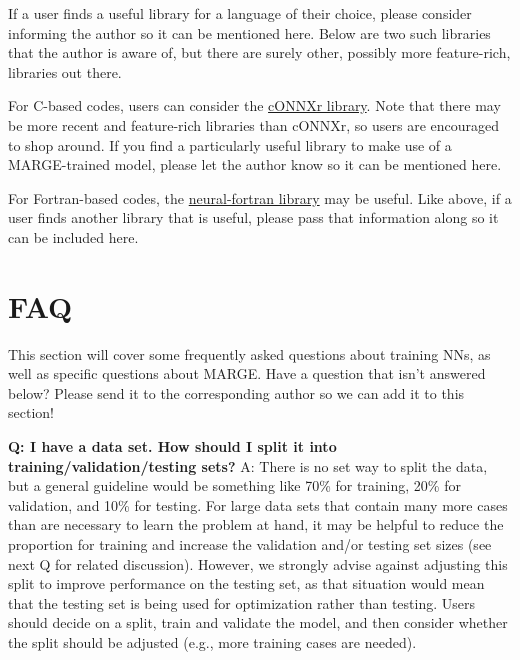 \documentclass[letterpaper, 12pt]{article}
\begin{document}
\noindent If a user finds a useful library for a language of their choice, please 
consider informing the author so it can be mentioned here.  Below are two 
such libraries that the author is aware of, but there are surely other, possibly 
more feature-rich, libraries out there. \newline

\noindent For C-based codes, users can consider the 
\href{https://github.com/alrevuelta/cONNXr}{cONNXr library}.  Note that there 
may be more recent and feature-rich libraries than cONNXr, so users are 
encouraged to shop around.  If you find a particularly useful library to make 
use of a MARGE-trained model, please let the author know so it can be 
mentioned here. \newline

\noindent For Fortran-based codes, the 
\href{https://github.com/modern-fortran/neural-fortran}{neural-fortran library} 
may be useful.  Like above, if a user finds another library that is useful, 
please pass that information along so it can be included here.


\section{FAQ}

This section will cover some frequently asked questions about training NNs, 
as well as specific questions about MARGE.  Have a question that isn't 
answered below?  Please send it to the corresponding author so we can add 
it to this section! \newline

\noindent \textbf{Q: I have a data set.  How should I split it into 
training/validation/testing sets?}  A: There is no set way to split the data, 
but a general guideline would be something like 70\% for training, 20\% for 
validation, and 10\% for testing.  For large data sets that contain many more 
cases than are necessary to learn the problem at hand, it may be helpful to 
reduce the proportion for training and increase the validation and/or testing 
set sizes (see next Q for related discussion).  However, we strongly advise 
against adjusting this split to improve
performance on the testing set, as that situation would mean that the testing 
set is being used for optimization rather than testing.  Users should decide 
on a split, train and validate the model, and then consider whether the split 
should be adjusted (e.g., more training cases are needed).  \newline 
\end{document}
